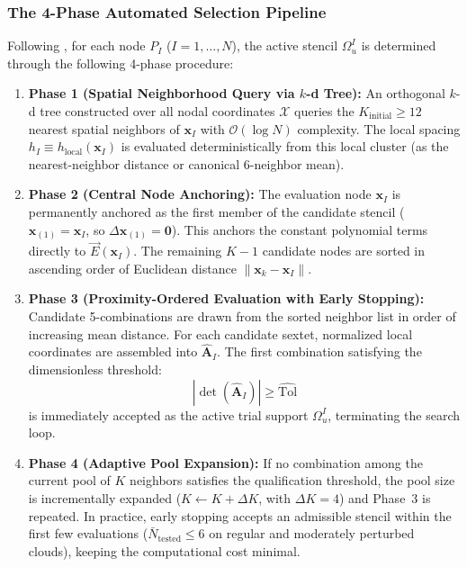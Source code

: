 \documentclass[VANCOUVER,Times1COL]{WileyNJD-v5}
\begin{document}
\subsubsection{The 4-Phase Automated Selection Pipeline}
Following \cite{stable_vnmm2d_2026}, for each node $P_I$ ($I = 1, \dots, N$), the active stencil $\Omega_u^I$ is determined through the following 4-phase procedure:
\begin{enumerate}
    \item \textbf{Phase 1 (Spatial Neighborhood Query via $k$-d Tree):} An orthogonal $k$-d tree constructed over all nodal coordinates $\mathcal{X}$ queries the $K_{\mathrm{initial}} \ge 12$ nearest spatial neighbors of $\mathbf{x}_I$ with $\mathcal{O}(\log N)$ complexity. The local spacing $h_I \equiv h_{\mathrm{local}}(\mathbf{x}_I)$ is evaluated deterministically from this local cluster (as the nearest-neighbor distance or canonical 6-neighbor mean).
    \item \textbf{Phase 2 (Central Node Anchoring):} The evaluation node $\mathbf{x}_I$ is permanently anchored as the first member of the candidate stencil ($\mathbf{x}_{(1)} = \mathbf{x}_I$, so $\Delta\mathbf{x}_{(1)} = \mathbf{0}$). This anchors the constant polynomial terms directly to $\vec{E}(\mathbf{x}_I)$. The remaining $K-1$ candidate nodes are sorted in ascending order of Euclidean distance $\|\mathbf{x}_k - \mathbf{x}_I\|$.
    \item \textbf{Phase 3 (Proximity-Ordered Evaluation with Early Stopping):} Candidate 5-combinations are drawn from the sorted neighbor list in order of increasing mean distance. For each candidate sextet, normalized local coordinates are assembled into $\widehat{\mathbf{A}}_I$. The first combination satisfying the dimensionless threshold:
          \begin{equation}
              |\det(\widehat{\mathbf{A}}_I)| \ge \widehat{\mathrm{Tol}}
          \end{equation}
          is immediately accepted as the active trial support $\Omega_u^I$, terminating the search loop.
    \item \textbf{Phase 4 (Adaptive Pool Expansion):} If no combination among the current pool of $K$ neighbors satisfies the qualification threshold, the pool size is incrementally expanded ($K \leftarrow K + \Delta K$, with $\Delta K = 4$) and Phase~3 is repeated. In practice, early stopping accepts an admissible stencil within the first few evaluations ($\bar{N}_{\mathrm{tested}} \le 6$ on regular and moderately perturbed clouds), keeping the computational cost minimal.
\end{enumerate}
\end{document}
